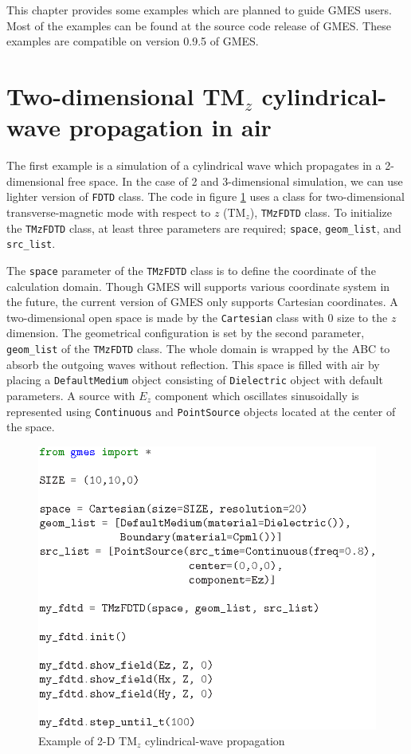 This chapter provides some examples which are planned to guide GMES users. Most of the examples can be found at the source code release of GMES. These examples are compatible on version 0.9.5 of GMES.

\section{Two-dimensional TM$_z$ cylindrical-wave propagation in air}
The first example is a simulation of a cylindrical wave which propagates in a 2-dimensional free space. In the case of 2 and 3-dimensional simulation, we can use lighter version of \texttt{FDTD} class. The code in figure \ref{fig:air2d_code} uses a class for two-dimensional transverse-magnetic mode with respect to $z$ (TM$_z$), \texttt{TMzFDTD} class. To initialize the \texttt{TMzFDTD} class, at least three parameters are required; \texttt{space}, \texttt{geom\_list}, and \texttt{src\_list}.

The \texttt{space} parameter of the \texttt{TMzFDTD} class is to define the coordinate of the calculation domain. Though GMES will supports various coordinate system in the future, the current version of GMES only supports Cartesian coordinates. A two-dimensional open space is made by the \texttt{Cartesian} class with 0 size to the $z$ dimension. The geometrical configuration is set by the second parameter, \texttt{geom\_list} of the \texttt{TMzFDTD} class. The whole domain is wrapped by the ABC to absorb the outgoing waves without reflection. This space is filled with air by placing a \texttt{DefaultMedium} object consisting of \texttt{Dielectric} object with default parameters. A source with $E_z$ component which oscillates sinusoidally is represented using \texttt{Continuous} and \texttt{PointSource} objects located at the center of the space.

\begin{figure}[hp!]
  \centering
  \includegraphics{figure/air2d}
  \caption{Example of 2-D TM$_z$ cylindrical-wave propagation}
  \label{fig:air2d_code}
\end{figure}

